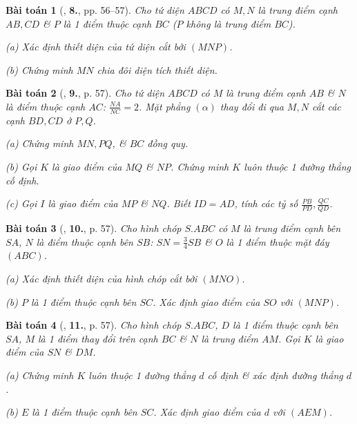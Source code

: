 \documentclass{article}
\numberwithin{equation}{section}
\newtheorem{baitoan}{Bài toán}[section]
\begin{document}
\begin{baitoan}[\cite{TL_chuyen_Toan_Hinh_Hoc_11}, \textbf{8.}, pp. 56--57]
	Cho tứ diện $ABCD$ có $M,N$ là trung điểm cạnh $AB,CD$ \& $P$ là 1 điểm thuộc cạnh $BC$ ($P$ không là trung điểm $BC$).
	\begin{enumerate*}
		\item[(a)] Xác định thiết diện của tứ diện cắt bởi $(MNP)$.
		\item[(b)] Chứng minh $MN$ chia đôi diện tích thiết diện.
	\end{enumerate*}
\end{baitoan}

\begin{baitoan}[\cite{TL_chuyen_Toan_Hinh_Hoc_11}, \textbf{9.}, p. 57]
	Cho tứ diện $ABCD$ có $M$ là trung điểm cạnh $AB$ \& $N$ là điểm thuộc cạnh $AC$: $\frac{NA}{NC} = 2$. Mặt phẳng $(\alpha)$ thay đổi đi qua $M,N$ cắt các cạnh $BD,CD$ ở $P,Q$.
	\begin{enumerate*}
		\item[(a)] Chứng minh $MN,PQ$, \& $BC$ đồng quy.
		\item[(b)] Gọi $K$ là giao điểm của $MQ$ \& $NP$. Chứng minh $K$ luôn thuộc 1 đường thẳng cố định.
		\item[(c)] Gọi $I$ là giao điểm của $MP$ \& $NQ$. Biết $ID = AD$, tính các tỷ số $\frac{PB}{PD},\frac{QC}{QD}$.
	\end{enumerate*}
\end{baitoan}

\begin{baitoan}[\cite{TL_chuyen_Toan_Hinh_Hoc_11}, \textbf{10.}, p. 57]
	Cho hình chóp $S.ABC$ có $M$ là trung điểm cạnh bên $SA$, $N$ là điểm thuộc cạnh bên $SB$: $SN = \frac{3}{4}SB$ \& $O$ là 1 điểm thuộc mặt đáy $(ABC)$.
	\begin{enumerate*}
		\item[(a)] Xác định thiết diện của hình chóp cắt bởi $(MNO)$.
		\item[(b)] $P$ là 1 điểm thuộc cạnh bên $SC$. Xác định giao điểm của $SO$ với $(MNP)$.
	\end{enumerate*}
\end{baitoan}

\begin{baitoan}[\cite{TL_chuyen_Toan_Hinh_Hoc_11}, \textbf{11.}, p. 57]
	Cho hình chóp $S.ABC$, $D$ là 1 điểm thuộc cạnh bên $SA$, $M$ là 1 điểm thay đổi trên cạnh $BC$ \& $N$ là trung điểm $AM$. Gọi $K$ là giao điểm của $SN$ \& $DM$.
	\begin{enumerate*}
		\item[(a)] Chứng minh $K$ luôn thuộc 1 đường thẳng $d$ cố định \& xác định đường thẳng $d$.
		\item[(b)] $E$ là 1 điểm thuộc cạnh bên $SC$. Xác định giao điểm của $d$ với $(AEM)$.
	\end{enumerate*}
\end{baitoan}
\end{document}
